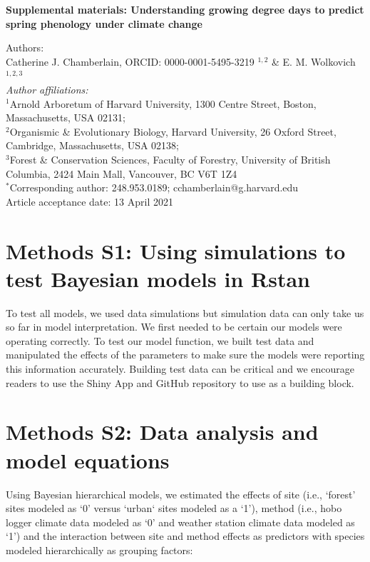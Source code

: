 \documentclass{article}\usepackage[]{graphicx}\usepackage[]{color}
\begin{document}
\noindent \textbf{\Large{Supplemental materials: Understanding growing degree days to predict spring phenology under climate change}}

\noindent Authors:\\
Catherine J. Chamberlain, ORCID: 0000-0001-5495-3219 $^{1,2}$ \& E. M. Wolkovich $^{1,2,3}$
\vspace{2ex}\\
\emph{Author affiliations:}\\
$^{1}$Arnold Arboretum of Harvard University, 1300 Centre Street, Boston, Massachusetts, USA 02131; \\
$^{2}$Organismic \& Evolutionary Biology, Harvard University, 26 Oxford Street, Cambridge, Massachusetts, USA 02138; \\
$^{3}$Forest \& Conservation Sciences, Faculty of Forestry, University of British Columbia, 2424 Main Mall, Vancouver, BC V6T 1Z4\\
\vspace{2ex}
$^*$Corresponding author: 248.953.0189; cchamberlain@g.harvard.edu\\
\vspace{2ex}
Article acceptance date: 13 April 2021

\renewcommand{\thetable}{S\arabic{table}}
\renewcommand{\thefigure}{S\arabic{figure}}
\renewcommand{\labelitemi}{$-$}



\section*{Methods S1: Using simulations to test Bayesian models in Rstan}
To test all models, we used data simulations but simulation data can only take us so far in model interpretation. We first needed to be certain our models were operating correctly. To test our model function, we built test data and manipulated the effects of the parameters to make sure the models were reporting this information accurately. Building test data can be critical and we encourage readers to use the Shiny App and GitHub repository to use as a building block. 

\section*{Methods S2: Data analysis and model equations}
Using Bayesian hierarchical models, we estimated the effects of site (i.e., `forest' sites modeled as `0' versus `urban` sites modeled as a `1'), method (i.e., hobo logger climate data modeled as `0' and weather station climate data modeled as `1') and the interaction between site and method effects as predictors with species modeled hierarchically as grouping factors:
\end{document}
